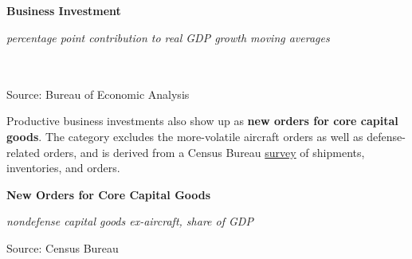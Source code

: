 \documentclass{report}
\newcommand{\tbllink}[1]{\href{https://raw.githubusercontent.com/bdecon/US-chartbook/master/chartbook/data/#1}{\faTable}}
\begin{document}
{{{\begin{minipage}{0.76\textwidth}
\vspace{5mm}

\small  

\end{minipage}

\normalsize \textbf{Business Investment}\\
\footnotesize{\textit{percentage point contribution to real GDP growth \hspace{36mm} moving averages}\\ \vspace{4mm}
 \setlength{\tabcolsep}{3.1pt} \color{black!90}
		{\renewcommand{\arraystretch}{1.55}
		 \begin{tabular}{p{42mm} R{6.7mm} R{6.7mm} R{6.7mm} R{6.7mm} R{6.7mm} 
		   R{7.8mm} R{6.7mm} R{6.7mm} }
			 \hline
		\end{tabular}
		}	\\
		
\vspace{-6mm}
\footnotesize{Source: Bureau of Economic Analysis}
\newpage
\begin{minipage}{0.33\textwidth}
\small Productive business investments also show up as \textbf{new orders for core capital goods}. The category excludes the more-volatile aircraft orders as well as defense-related orders, and is derived from a Census Bureau \href{https://www.census.gov/manufacturing/m3/index.html}{survey} of shipments, inventories, and orders.  \\


\end{minipage} \hspace{6mm}
\begin{minipage}{0.43\textwidth}

\normalsize \textbf{New Orders for Core Capital Goods}

\footnotesize{\textit{nondefense capital goods ex-aircraft, share of GDP}}

\hspace*{-2mm} 

\footnotesize{Source: Census Bureau} \hspace{23mm} \tbllink{dgno.csv}
\end{minipage}


\vspace{12mm}

}}}}
\end{document}
